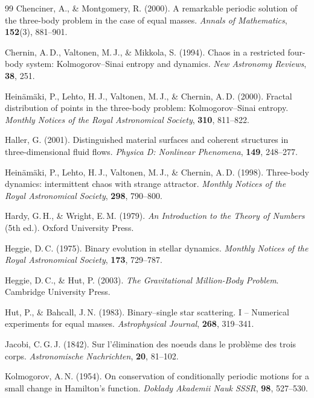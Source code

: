 \documentclass[11pt,a4paper]{article}
\begin{document}
\begin{thebibliography}{99}
Chenciner, A., \& Montgomery, R. (2000).
A remarkable periodic solution of the three-body problem in the case of equal masses.
\textit{Annals of Mathematics}, \textbf{152}(3), 881--901.

Chernin, A.\,D., Valtonen, M.\,J., \& Mikkola, S. (1994).
Chaos in a restricted four-body system: Kolmogorov--Sinai entropy and dynamics.
\textit{New Astronomy Reviews}, \textbf{38}, 251.

Heinäm\"{a}ki, P., Lehto, H.\,J., Valtonen, M.\,J., \& Chernin, A.\,D. (2000).
Fractal distribution of points in the three-body problem: Kolmogorov--Sinai entropy.
\textit{Monthly Notices of the Royal Astronomical Society}, \textbf{310}, 811--822.

Haller, G. (2001).
Distinguished material surfaces and coherent structures in three-dimensional fluid flows.
\textit{Physica D: Nonlinear Phenomena}, \textbf{149}, 248--277.

Heinäm\"{a}ki, P., Lehto, H.\,J., Valtonen, M.\,J., \& Chernin, A.\,D. (1998).
Three-body dynamics: intermittent chaos with strange attractor.
\textit{Monthly Notices of the Royal Astronomical Society}, \textbf{298}, 790--800.

Hardy, G.\,H., \& Wright, E.\,M. (1979).
\textit{An Introduction to the Theory of Numbers} (5th ed.).
Oxford University Press.

Heggie, D.\,C. (1975).
Binary evolution in stellar dynamics.
\textit{Monthly Notices of the Royal Astronomical Society}, \textbf{173}, 729--787.

Heggie, D.\,C., \& Hut, P. (2003).
\textit{The Gravitational Million-Body Problem}.
Cambridge University Press.

Hut, P., \& Bahcall, J.\,N. (1983).
Binary--single star scattering. I -- Numerical experiments for equal masses.
\textit{Astrophysical Journal}, \textbf{268}, 319--341.

Jacobi, C.\,G.\,J. (1842).
Sur l'\'{e}limination des noeuds dans le probl\`{e}me des trois corps.
\textit{Astronomische Nachrichten}, \textbf{20}, 81--102.

Kolmogorov, A.\,N. (1954).
On conservation of conditionally periodic motions for a small change in Hamilton's function.
\textit{Doklady Akademii Nauk SSSR}, \textbf{98}, 527--530.


\end{thebibliography}
\end{document}

